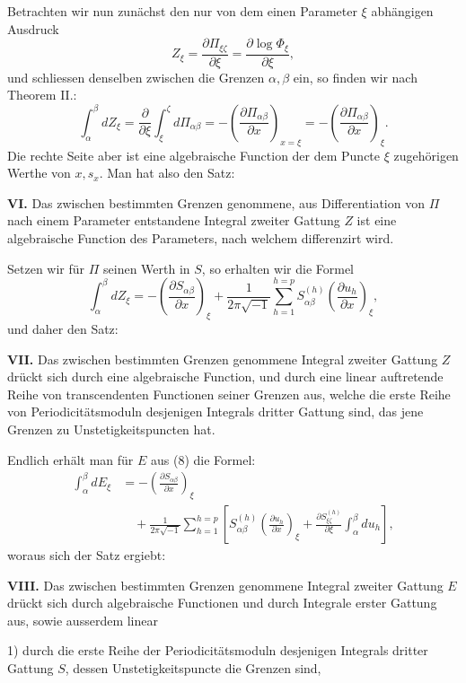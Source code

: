 \documentclass[10pt]{article}
\begin{document}
Betrachten wir nun zunächst den nur von dem einen Parameter \(\xi\) abhängigen Ausdruck
\[
\tag{9}
Z_\xi=\frac{\partial \Pi_{\xi\zeta}}{\partial \xi}=\frac{\partial \log\Phi_\xi}{\partial \xi},
\]
und schliessen denselben zwischen die Grenzen \(\alpha,\beta\) ein, so finden wir nach Theorem II.:
\[
\tag{10}
\int_{\alpha}^{\beta}dZ_\xi
=\frac{\partial}{\partial \xi}\int_{\xi}^{\zeta}d\Pi_{\alpha\beta}
=-\left(\frac{\partial\Pi_{\alpha\beta}}{\partial x}\right)_{x=\xi}
=-\left(\frac{\partial\Pi_{\alpha\beta}}{\partial x}\right)_\xi.
\]
Die rechte Seite aber ist eine algebraische Function der dem Puncte \(\xi\) zugehörigen Werthe von \(x,s_x\). Man hat also den Satz:

\noindent\textbf{VI.} Das zwischen bestimmten Grenzen genommene, aus Differentiation von \(\Pi\) nach einem Parameter entstandene Integral zweiter Gattung \(Z\) ist eine algebraische Function des Parameters, nach welchem differenzirt wird.

Setzen wir für \(\Pi\) seinen Werth in \(S\), so erhalten wir die Formel
\[
\tag{11}
\int_{\alpha}^{\beta}dZ_\xi
=-\left(\frac{\partial S_{\alpha\beta}}{\partial x}\right)_\xi
+\frac{1}{2\pi\sqrt{-1}}\sum_{h=1}^{h=p}S_{\alpha\beta}^{(h)}
\left(\frac{\partial u_h}{\partial x}\right)_\xi,
\]
und daher den Satz:

\noindent\textbf{VII.} Das zwischen bestimmten Grenzen genommene Integral zweiter Gattung \(Z\) drückt sich durch eine algebraische Function, und durch eine linear auftretende Reihe von transcendenten Functionen seiner Grenzen aus, welche die erste Reihe von Periodicitätsmoduln desjenigen Integrals dritter Gattung sind, das jene Grenzen zu Unstetigkeitspuncten hat.

Endlich erhält man für \(E\) aus (8) die Formel:
\[
\tag{12}
\begin{aligned}
\int_{\alpha}^{\beta}dE_\xi
&=-\left(\frac{\partial S_{\alpha\beta}}{\partial x}\right)_\xi\\
&\quad+\frac{1}{2\pi\sqrt{-1}}\sum_{h=1}^{h=p}\left[
S_{\alpha\beta}^{(h)}\left(\frac{\partial u_h}{\partial x}\right)_\xi
+\frac{\partial S_{\xi\zeta}^{(h)}}{\partial \xi}\int_{\alpha}^{\beta}du_h\right],
\end{aligned}
\]
woraus sich der Satz ergiebt:

\noindent\textbf{VIII.} Das zwischen bestimmten Grenzen genommene Integral zweiter Gattung \(E\) drückt sich durch algebraische Functionen und durch Integrale erster Gattung aus, sowie ausserdem linear

1) durch die erste Reihe der Periodicitätsmoduln desjenigen Integrals dritter Gattung \(S\), dessen Unstetigkeitspuncte die Grenzen sind,
\end{document}
